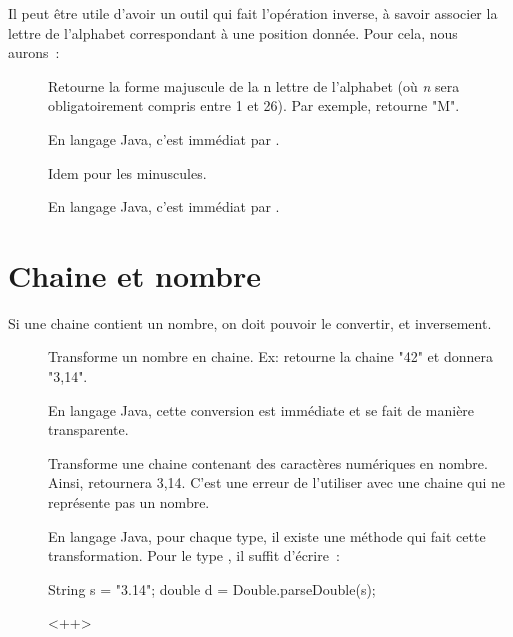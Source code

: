 	Il peut être utile d’avoir un outil qui fait l’opération inverse, 
	à savoir associer la lettre de l’alphabet correspondant à une position donnée. 
	Pour cela, nous aurons~: 

	\begin{description}

		\item[]
		Retourne la forme majuscule de la n\ieme{} lettre de l’alphabet 
		(où \textit{n} sera obligatoirement compris entre 1 et 26). 
		Par exemple,  retourne "M".

		En langage Java, c'est immédiat par .

	\item[]
		Idem pour les minuscules.
		
		En langage Java, c'est immédiat par .

	\end{description}

	
\section{Chaine et nombre}

	Si une chaine contient un nombre,
	on doit pouvoir le convertir, et inversement.

	\begin{description}
	
		\item[]
		Transforme un nombre en chaine.
		Ex:  retourne la chaine "42"
		et  donnera "3,14". 

		En langage Java, cette conversion est immédiate et se fait de 
		manière transparente.

		\item[]
		Transforme une chaine contenant des caractères numériques 
		en nombre.
		Ainsi,  retournera 3,14. 
		C’est une erreur de l’utiliser avec une chaine
		qui ne représente pas un nombre.
	
		En langage Java, pour chaque type, il existe une méthode qui fait cette
		transformation. Pour le type , il suffit d'écrire~:

		\begin{java}
String s = "3.14";		
double d = Double.parseDouble(s);			
		\end{java}<++>

	\end{description}
	
